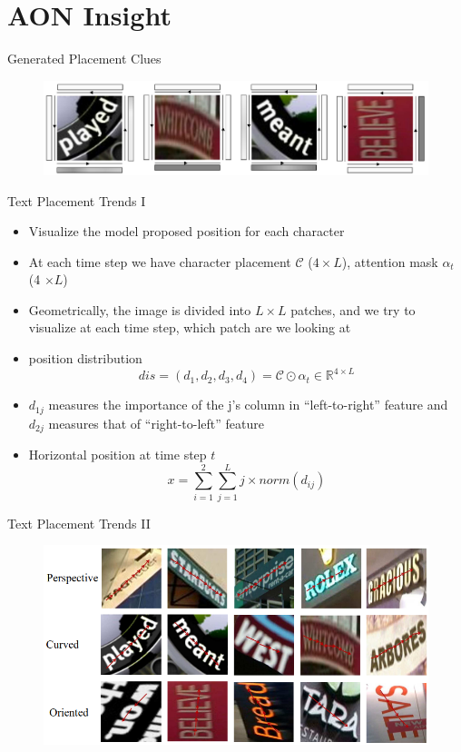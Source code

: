 \documentclass[compress]{beamer}
\begin{document}
\section{AON Insight}
\begin{frame}{Generated Placement Clues}
    \begin{figure}
        \includegraphics[width=\textwidth]{cnres}
    \end{figure}
\end{frame}

\begin{frame}{Text Placement Trends I}
    \begin{itemize}
        \item <+->Visualize the model proposed position for each character
        \item <+->At each time step we have character placement $\mathcal{C}$ ($4\times L$), attention mask $\alpha_t$ (4 $\times L$)
        \item <+->Geometrically, the image is divided into $L\times L$ patches, and we try to visualize at each time step, which patch are we looking at
        \item <+->position distribution
            \begin{equation*}
                dis = (d_1,d_2,d_3,d_4) = \mathcal{C} \odot \alpha_t \in \mathbb{R}^{4\times L}
            \end{equation*}
        \item <+->$d_{1j}$ measures the importance of the j's column in ``left-to-right'' feature and $d_{2j}$ measures that of ``right-to-left'' feature
        \item <+->Horizontal position at time step $t$
            \begin{equation*}
                x = \sum_{i=1}^2\sum_{j=1}^L j \times norm(d_{ij})
            \end{equation*}
    \end{itemize}
\end{frame}

\begin{frame}{Text Placement Trends II}
    \begin{figure}
        \includegraphics[width=\textwidth]{trends}
    \end{figure}
\end{frame}
\end{document}
